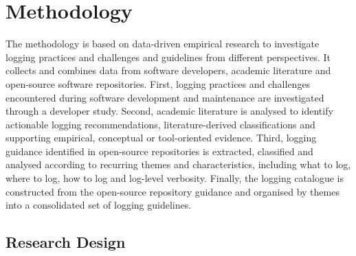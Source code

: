 \chapter{Methodology} \label{chap:methodology}

The methodology is based on data-driven empirical research to investigate logging practices and challenges
and guidelines from different perspectives.
It collects and combines data from software developers, academic literature and open-source software repositories.
First, logging practices and challenges encountered during software development
and maintenance are investigated through a developer study.
Second, academic literature is analysed to identify actionable logging
recommendations, literature-derived classifications and supporting empirical,
conceptual or tool-oriented evidence.
Third, logging guidance identified in open-source repositories is extracted,
classified and analysed according to recurring themes and characteristics, including
what to log, where to log, how to log and log-level verbosity.
Finally, the logging catalogue is constructed from the open-source repository
guidance and organised by themes into a consolidated set of logging guidelines.

\section{Research Design}

